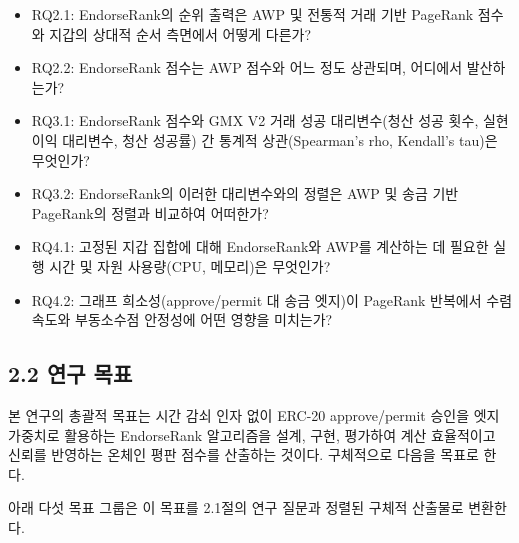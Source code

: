 \begin{itemize}
\item[\textendash] RQ2.1: EndorseRank의 순위 출력은 AWP 및 전통적 거래 기반 PageRank 점수와 지갑의 상대적 순서 측면에서 어떻게 다른가?
\item[\textendash] RQ2.2: EndorseRank 점수는 AWP 점수와 어느 정도 상관되며, 어디에서 발산하는가?
\end{itemize}

\begin{itemize}
\item[\textendash] RQ3.1: EndorseRank 점수와 GMX V2 거래 성공 대리변수(청산 성공 횟수, 실현 이익 대리변수, 청산 성공률) 간 통계적 상관(Spearman's rho, Kendall's tau)은 무엇인가?
\item[\textendash] RQ3.2: EndorseRank의 이러한 대리변수와의 정렬은 AWP 및 송금 기반 PageRank의 정렬과 비교하여 어떠한가?
\end{itemize}

\begin{itemize}
\item[\textendash] RQ4.1: 고정된 지갑 집합에 대해 EndorseRank와 AWP를 계산하는 데 필요한 실행 시간 및 자원 사용량(CPU, 메모리)은 무엇인가?
\item[\textendash] RQ4.2: 그래프 희소성(approve/permit 대 송금 엣지)이 PageRank 반복에서 수렴 속도와 부동소수점 안정성에 어떤 영향을 미치는가?
\end{itemize}
\subsection*{2.2 연구 목표}
\label{sec:objectives}

본 연구의 총괄적 목표는 시간 감쇠 인자 없이 ERC-20 approve/permit 승인을 엣지 가중치로 활용하는 EndorseRank 알고리즘을 설계, 구현, 평가하여 계산 효율적이고 신뢰를 반영하는 온체인 평판 점수를 산출하는 것이다. 구체적으로 다음을 목표로 한다.


아래 다섯 목표 그룹은 이 목표를 2.1절의 연구 질문과 정렬된 구체적 산출물로 변환한다.



